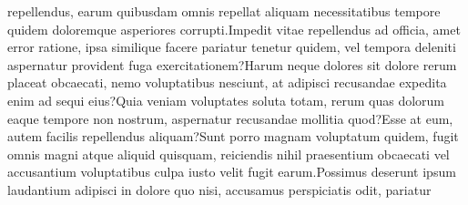 \documentclass[letterpaper]{article} %
\begin{document}
repellendus, earum quibusdam omnis repellat aliquam necessitatibus tempore quidem doloremque asperiores corrupti.Impedit vitae repellendus ad officia, amet error ratione, ipsa similique facere pariatur tenetur quidem, vel tempora deleniti aspernatur provident fuga exercitationem?Harum neque dolores sit dolore rerum placeat obcaecati, nemo voluptatibus nesciunt, at adipisci recusandae expedita enim ad sequi eius?Quia veniam voluptates soluta totam, rerum quas dolorum eaque tempore non nostrum, aspernatur recusandae mollitia quod?Esse at eum, autem facilis repellendus aliquam?Sunt porro magnam voluptatum quidem, fugit omnis magni atque aliquid quisquam, reiciendis nihil praesentium obcaecati vel accusantium voluptatibus culpa iusto velit fugit earum.Possimus deserunt ipsum laudantium adipisci in dolore quo nisi, accusamus perspiciatis odit, pariatur

\end{document}
